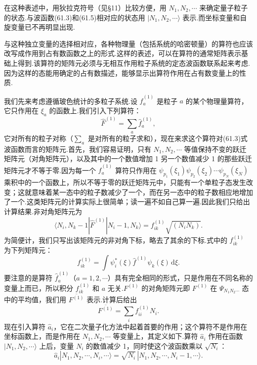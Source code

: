 在这种表述中，用狄拉克符号（见§11）比较方便，用 $N_1,N_2,\cdots$ 来确定量子粒子的状态.与波函数(61.3)和(61.5)相对应的状态用 $|N_1,N_2,\cdots\rangle$ 表示.而坐标变量和自旋变量已不再明显出现.

与这种独立变量的选择相对应，各种物理量（包括系统的哈密顿量）的算符也应该改写成作用到占有数函数之上的形式.这样的表述，可以在算符的通常矩阵表示基础上得到.该算符的矩阵元必须与无相互作用粒子系统的定态波函数联系起来考虑.因为这样的态能用确定的占有数描述，能够显示出算符作用在占有数变量上的性质.

我们先来考虑遵循玻色统计的多粒子系统.设 $\hat{f}_a^{(1)}$ 是粒子 $a$ 的某个物理量算符，它只作用在 $\xi_a$ 的函数上.我们引入下列算符：
\begin{equation}
  \hat{F}^{(1)}=\sum_a\hat{f}_a^{(1)},
\end{equation}
它对所有的粒子对称（$\sum_a$ 是对所有的粒子求和），现在来求这个算符对(61.3)式波函数而言的矩阵元.首先，我们容易证明，只有 $N_1,N_2,\cdots$ 等值保持不变的跃迁矩阵元（对角矩阵元），以及其中的一个数值增加 1 另一个数值减少 1 的那些跃迁矩阵元才不等于零.因为每一个 $\hat{f}_a^{(1)}$ 算符只作用在 $\psi_{p_1}(\xi_1)\psi_{p_2}(\xi_2)\cdots\psi_{p_N}(\xi_N)$ 乘积中的一个函数上，所以不等于零的跃迁矩阵元中，只能有一个单粒子态发生改变；这就意味着某一态中的粒子数减少了一个，而在另一态中的粒子数相应地增加了一个.这类矩阵元的计算实际上很简单；读一遍不如自己算一遍.因此我们只给出计算结果.非对角矩阵元为
\begin{equation}
  \langle N_i,N_k-1|\hat{F}^{(1)}|N_i-1,N_k\rangle=f_{ik}^{(1)}\sqrt{(N_iN_k)}.
\end{equation}
为简便计，我们只写出该矩阵元的非对角下标，略去了其余的下标.式中的 $f_{ik}^{(1)}$ 为下列矩阵元：
\begin{equation}
  f_{ik}^{(1)}=\int\psi_i^{*}(\xi)\hat{f}^{(1)}\psi_k(\xi)\,\mathrm{d}\xi.
\end{equation}
要注意的是算符 $\hat{f}_a^{(1)}$（$a=1,2,\cdots$）具有完全相同的形式，只是作用在不同名称的变量上而已，所以积分 $f_{ik}^{(1)}$ 和 $a$ 无关.$F^{(1)}$ 的对角矩阵元即 $F^{(1)}$ 在 $\boldsymbol{\varPsi}_{N_1N_2\cdots}$ 态中的平均值，我们用 $\overline{F^{(1)}}$ 表示.计算后给出
\begin{equation}
  \overline{F^{(1)}}=\sum_i f_{ii}^{(1)}N_i.
\end{equation}
现在引入算符 $\hat{a}_i$，它在二次量子化方法中起着首要的作用；这个算符不是作用在坐标函数上，而是作用在 $N_1,N_2,\cdots$ 等变量上，其定义如下.算符 $\hat{a}_i$ 作用在函数 $|N_1,N_2,\cdots\rangle$ 上后，变量 $N_i$ 的数值减少 1，同时使这个波函数乘以 $\sqrt{N_i}$：
\begin{equation}
  \hat{a}_i|N_1,N_2,\cdots,N_i,\cdots\rangle=\sqrt{N_i}\,|N_1,N_2,\cdots,N_i-1,\cdots\rangle.
\end{equation}

